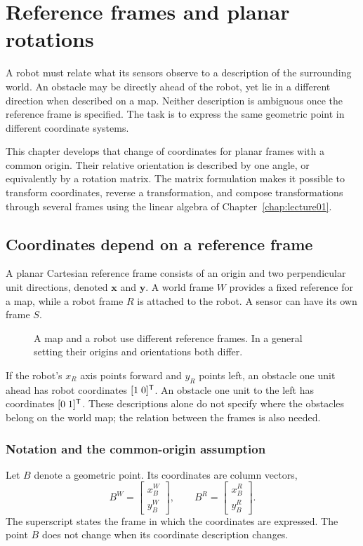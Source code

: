 \chapter{Reference frames and planar rotations}
\label{chap:lecture02}

A robot must relate what its sensors observe to a description of the surrounding
world. An obstacle may be directly ahead of the robot, yet lie in a different
direction when described on a map. Neither description is ambiguous once the
reference frame is specified. The task is to express the same geometric point
in different coordinate systems.

This chapter develops that change of coordinates for planar frames with a
common origin. Their relative orientation is described by one angle, or
equivalently by a rotation matrix. The matrix formulation makes it possible to
transform coordinates, reverse a transformation, and compose transformations
through several frames using the linear algebra of Chapter~\ref{chap:lecture01}.

\section{Coordinates depend on a reference frame}
A planar Cartesian reference frame consists of an origin and two perpendicular
unit directions, denoted $\boldsymbol{x}$ and $\boldsymbol{y}$. A world frame
$W$ provides a fixed reference for a map, while a robot frame $R$ is attached
to the robot. A sensor can have its own frame $S$.

\begin{figure}[htbp]
\centering
\caption{A map and a robot use different reference frames. In a general setting
their origins and orientations both differ.}
\label{fig:l02-map}
\end{figure}

If the robot's $x_R$ axis points forward and $y_R$ points left, an obstacle one
unit ahead has robot coordinates $[1\;0]^{\mathsf T}$. An obstacle one unit to the
left has coordinates $[0\;1]^{\mathsf T}$. These descriptions alone do not specify
where the obstacles belong on the world map; the relation between the frames
is also needed.

\subsection{Notation and the common-origin assumption}
Let $B$ denote a geometric point. Its coordinates are column vectors,
\begin{equation}
 B^W=\begin{bmatrix}x_B^W\\y_B^W\end{bmatrix},\qquad
 B^R=\begin{bmatrix}x_B^R\\y_B^R\end{bmatrix}.
\end{equation}
The superscript states the frame in which the coordinates are expressed.
The point $B$ does not change when its coordinate description changes.

